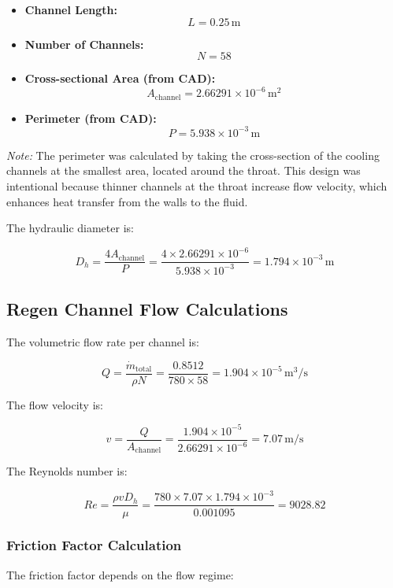 \begin{itemize}
    \item \textbf{Channel Length:} 
    \[
    L = 0.25 \, \si{\meter}
    \]
    \item \textbf{Number of Channels:} 
    \[
    N = 58
    \]
    \item \textbf{Cross-sectional Area (from CAD):} 
    \[
    A_{\text{channel}} = 2.66291 \times 10^{-6} \, \si{\meter^2}
    \]
    \item \textbf{Perimeter (from CAD):} 
    \[
    P = 5.938 \times 10^{-3} \, \si{\meter}
    \]
\end{itemize}

\textit{Note:} The perimeter was calculated by taking the cross-section of the cooling channels at the smallest area, located around the throat. This design was intentional because thinner channels at the throat increase flow velocity, which enhances heat transfer from the walls to the fluid.

The hydraulic diameter is:

\[
D_h = \frac{4A_{\text{channel}}}{P} = \frac{4 \times 2.66291 \times 10^{-6}}{5.938 \times 10^{-3}} = 1.794 \times 10^{-3} \, \si{\meter}
\]


\subsection{Regen Channel Flow Calculations}

The volumetric flow rate per channel is:

\[
Q = \frac{\dot{m}_{\text{total}}}{\rho N} = \frac{0.8512}{780 \times 58} = 1.904 \times 10^{-5} \, \si{\meter^3\per\second}
\]

The flow velocity is:

\[
v = \frac{Q}{A_{\text{channel}}} = \frac{1.904 \times 10^{-5}}{2.66291 \times 10^{-6}} = 7.07 \, \si{\meter\per\second}
\]

The Reynolds number is:

\[
Re = \frac{\rho v D_h}{\mu} = \frac{780 \times 7.07 \times 1.794 \times 10^{-3}}{0.001095} = 9028.82
\]



\subsubsection{Friction Factor Calculation}

The friction factor depends on the flow regime:

